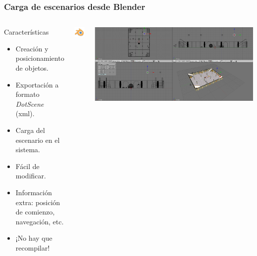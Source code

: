 \documentclass[green]{beamer}
\begin{document}
\begin{frame}
\transdissolve
    \frametitle{Carga de escenarios desde Blender}
    
    \begin{columns}[t]
    \column{150pt}
        
	\scriptsize{
	\begin{block}{Características}
            \begin{itemize}
                \item Creación y posicionamiento de objetos.
		\item Exportación a formato \emph{DotScene} (xml).
		\item Carga del escenario en el sistema.
		\item Fácil de modificar.
		\item Información extra: posición de comienzo, navegación, etc.
		\item ¡No hay que recompilar!
            \end{itemize}            
        \end{block}
	}

    \column{150pt}
	
	\begin{center}
	    \includegraphics[scale=0.5]{img/blender-icono.png}
	\end{center}
	
	\begin{center}
	    \includegraphics[scale=0.08]{img/escenarios-blender.png}
	\end{center}
	
    \end{columns} 
\end{frame}
\end{document}
